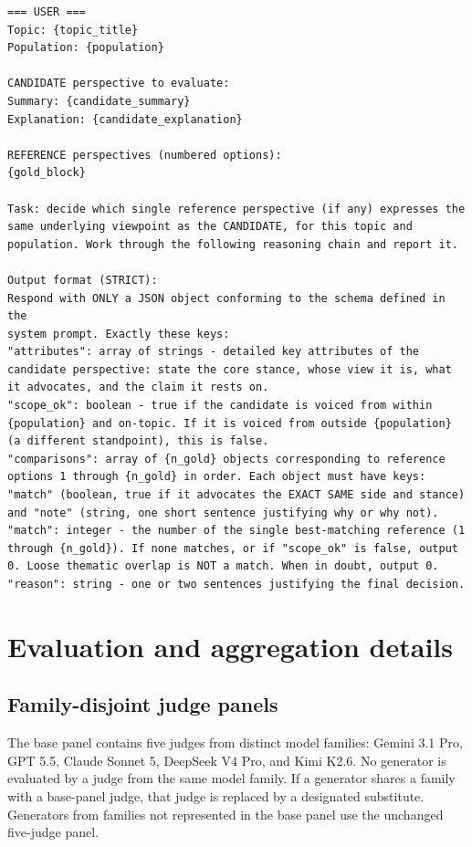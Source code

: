 \documentclass[11pt,a4paper]{article}
\begin{document}
\begin{tcolorbox}
\begin{lstlisting}[style=promptstyle]
=== USER ===
Topic: {topic_title}
Population: {population}

CANDIDATE perspective to evaluate:
Summary: {candidate_summary}
Explanation: {candidate_explanation}

REFERENCE perspectives (numbered options):
{gold_block}

Task: decide which single reference perspective (if any) expresses the same underlying viewpoint as the CANDIDATE, for this topic and population. Work through the following reasoning chain and report it.

Output format (STRICT):
Respond with ONLY a JSON object conforming to the schema defined in the
system prompt. Exactly these keys:
"attributes": array of strings - detailed key attributes of the candidate perspective: state the core stance, whose view it is, what it advocates, and the claim it rests on.
"scope_ok": boolean - true if the candidate is voiced from within {population} and on-topic. If it is voiced from outside {population} (a different standpoint), this is false.
"comparisons": array of {n_gold} objects corresponding to reference options 1 through {n_gold} in order. Each object must have keys: "match" (boolean, true if it advocates the EXACT SAME side and stance) and "note" (string, one short sentence justifying why or why not).
"match": integer - the number of the single best-matching reference (1 through {n_gold}). If none matches, or if "scope_ok" is false, output 0. Loose thematic overlap is NOT a match. When in doubt, output 0.
"reason": string - one or two sentences justifying the final decision.
\end{lstlisting}
\end{tcolorbox}

\section{Evaluation and aggregation details}
\label{app:evaluation}

\subsection{Family-disjoint judge panels}
\label{app:judge_panels}

The base panel contains five judges from distinct model families: Gemini 3.1 Pro, GPT 5.5, Claude Sonnet 5, DeepSeek V4 Pro, and Kimi K2.6. No generator is evaluated by a judge from the same model family. If a generator shares a family with a base-panel judge, that judge is replaced by a designated substitute. Generators from families not represented in the base panel use the unchanged five-judge panel.
\end{document}
